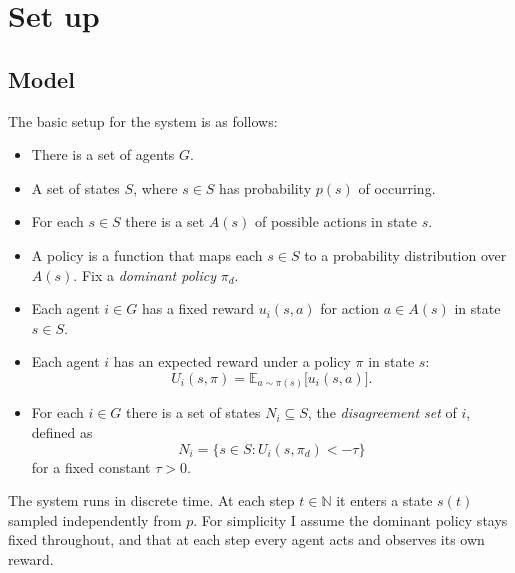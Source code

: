 \documentclass[11pt]{article}
\newcommand{\E}{\mathbb{E}}
\theoremstyle{plain}
\theoremstyle{definition}
\theoremstyle{remark}
\begin{document}
\section{Set up}\label{sec:setup}
\subsection{Model}
The basic setup for the system is as follows:
\begin{itemize}
    \item There is a set of agents $G$.
    \item A set of states $S$, where $s \in S$ has probability $p(s)$ of occurring.
    \item For each $s \in S$ there is a set $A(s)$ of possible actions in state $s$.
    \item A policy is a function that maps each $s \in S$ to a probability distribution over $A(s)$.
          Fix a \emph{dominant policy} $\pi_d$.
    \item Each agent $i \in G$ has a fixed reward $u_i(s, a)$ for action $a \in A(s)$ in state $s \in S$.
    \item Each agent $i$ has an expected reward under a policy $\pi$ in state $s$:
    \[ U_i(s, \pi) = \E_{a \sim \pi(s)}\Big[u_i(s, a)\Big]. \]
    \item For each $i \in G$ there is a set of states $N_i \subseteq S$, the \emph{disagreement set} of $i$, defined as
    \[ N_i = \{ s \in S : U_i(s, \pi_d) < -\tau \} \]
    for a fixed constant $\tau > 0$.
\end{itemize}
The system runs in discrete time. At each step $t \in \mathbb N$ it enters a state $s(t)$ sampled independently from $p$.
For simplicity I assume the dominant policy stays fixed throughout, and that at each step every agent acts and observes its own reward.
 
\end{document}
